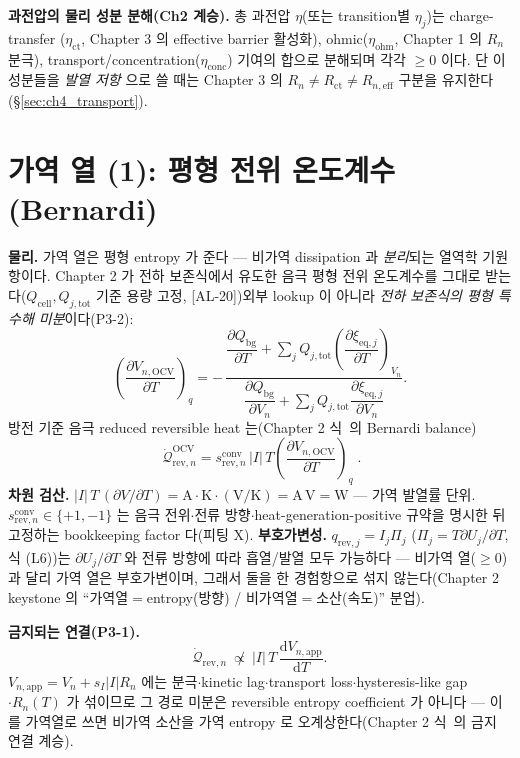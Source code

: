 \documentclass[11pt,a4paper]{article}
\newcommand{\dd}{\mathrm{d}}
\newcommand{\eff}{\mathrm{eff}}
\newcommand{\eq}{\mathrm{eq}}
\newcommand{\app}{\mathrm{app}}
\newcommand{\bg}{\mathrm{bg}}
\newcommand{\cell}{\mathrm{cell}}
\newcommand{\OCV}{\mathrm{OCV}}
\newcommand{\tot}{\mathrm{tot}}
\newcommand{\rev}{\mathrm{rev}}
\newcommand{\ct}{\mathrm{ct}}
\newcommand{\ohm}{\mathrm{ohm}}
\newcommand{\conc}{\mathrm{conc}}
\newcommand{\conv}{\mathrm{conv}}
\newcommand{\AL}[1]{\textsf{[AL-#1]}}
\begin{document}
\textbf{과전압의 물리 성분 분해(Ch2 계승).} 총 과전압 $\eta$(또는 transition별 $\eta_j$)는 charge-transfer
($\eta_\ct$, Chapter 3 의 effective barrier 활성화), ohmic($\eta_\ohm$, Chapter 1 의 $R_n$ 분극),
transport/concentration($\eta_\conc$) 기여의 합으로 분해되며 각각 $\ge0$ 이다. 단 이 성분들을 \emph{발열 저항}
으로 쓸 때는 Chapter 3 의 $R_n\ne R_\ct\ne R_{n,\eff}$ 구분을 유지한다(\S\ref{sec:ch4_transport}).

\section{가역 열 (1): 평형 전위 온도계수 (Bernardi)}\label{sec:ch4_revOCV}
\textbf{물리.} 가역 열은 평형 entropy 가 준다 — 비가역 dissipation 과 \emph{분리}되는 열역학 기원 항이다.
Chapter 2 가 전하 보존식에서 유도한 음극 평형 전위 온도계수를 그대로 받는다($Q_\cell,Q_{j,\tot}$ 기준 용량
고정, \AL{20})\textemdash 외부 lookup 이 아니라 \emph{전하 보존식의 평형 특수해 미분}이다(P3-2):
\begin{equation}
\left(\frac{\partial V_{n,\OCV}}{\partial T}\right)_q
=-\,\frac{\dfrac{\partial Q_\bg}{\partial T}+\displaystyle\sum_j Q_{j,\tot}\left(\dfrac{\partial\xi_{\eq,j}}{\partial T}\right)_{V_n}}
{\dfrac{\partial Q_\bg}{\partial V_n}+\displaystyle\sum_j Q_{j,\tot}\dfrac{\partial\xi_{\eq,j}}{\partial V_n}}.
\label{eq:ch4_ocv_dvdt}
\end{equation}
방전 기준 음극 reduced reversible heat 는(Chapter 2 식~의 Bernardi balance)
\begin{equation}
\boxed{\;\dot{\mathcal Q}_{\rev,n}^{\OCV}=s_{\rev,n}^{\conv}\,|I|\,T\left(\frac{\partial V_{n,\OCV}}{\partial T}\right)_q\;.}
\label{eq:ch4_rev_ocv}
\end{equation}
\textbf{차원 검산.} $|I|\,T\,(\partial V/\partial T)=\mathrm A\cdot\mathrm K\cdot(\mathrm{V/K})=\mathrm{A\,V}=\mathrm W$
— 가역 발열률 단위. $s_{\rev,n}^{\conv}\in\{+1,-1\}$ 는 음극 전위$\cdot$전류 방향$\cdot$heat-generation-positive
규약을 명시한 뒤 고정하는 bookkeeping factor 다(피팅 X).
\textbf{부호가변성.} $q_{\rev,j}=I_j\Pi_j$ ($\Pi_j=T\partial U_j/\partial T$, 식 (L6))는 $\partial U_j/\partial T$
와 전류 방향에 따라 흡열/발열 모두 가능하다 — 비가역 열($\ge0$)과 달리 가역 열은 부호가변이며, 그래서 둘을 한
경험항으로 섞지 않는다(Chapter 2 keystone 의 ``가역열$=$entropy(방향) / 비가역열$=$소산(속도)'' 분업).

\textbf{금지되는 연결(P3-1).}
\begin{equation}
\dot{\mathcal Q}_{\rev,n}\ \not\propto\ |I|\,T\,\frac{\dd V_{n,\app}}{\dd T}.
\label{eq:ch4_forbid}
\end{equation}
$V_{n,\app}=V_n+s_I|I|R_n$ 에는 분극$\cdot$kinetic lag$\cdot$transport loss$\cdot$hysteresis-like gap$\cdot R_n(T)$
가 섞이므로 그 경로 미분은 reversible entropy coefficient 가 아니다 — 이를 가역열로 쓰면 비가역 소산을 가역
entropy 로 오계상한다(Chapter 2 식~의 금지 연결 계승).
\end{document}
